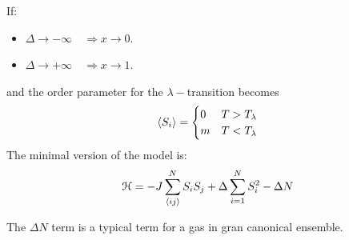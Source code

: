 \documentclass[../main/main.tex]{subfiles}
\begin{document}
If:
\begin{itemize}
\item \( \Delta \rightarrow - \infty \quad \Rightarrow x \rightarrow 0  \).
\item \( \Delta \rightarrow + \infty \quad \Rightarrow x \rightarrow 1  \).
\end{itemize}
and the order parameter for the \( \lambda - \)transition becomes
\begin{equation}
\expval{S_i} =
  \begin{cases}
   0 & T > T_{\lambda }\\
   m & T < T_{\lambda }
  \end{cases}
\end{equation}
The minimal version of the model is:
\begin{equation}
\mathcal{H} = - J \sum_{\expval{ij} }^{N} S_i S_j + \Delta \sum_{i=1}^{N} S_i^2 - \Delta N
\end{equation}
\begin{remark}
The \( \Delta N \) term is a typical term for a gas in gran canonical ensemble.
\end{remark}
\end{document}
